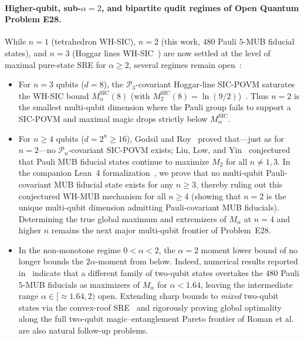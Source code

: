 \documentclass[11pt,a4paper]{article}
\theoremstyle{plain}
\theoremstyle{definition}
\theoremstyle{remark}
\newcommand{\Pauli}{\mathcal{P}}
\begin{document}
\paragraph{Higher-qubit, sub-$\alpha=2$, and bipartite qudit regimes of Open Quantum Problem E28.}
While $n = 1$ (tetrahedron WH-SIC), $n = 2$ (this work, $480$ Pauli $5$-MUB fiducial states), and $n = 3$ (Hoggar lines WH-SIC~\cite{Hoggar1998}) are now settled at the level of maximal pure-state SRE for $\alpha \ge 2$, several regimes remain open~\cite{LiuLowYin2026,OpenQuantumE28}:
\begin{itemize}[leftmargin=1.8em, itemsep=2pt]
  \item For $n = 3$ qubits ($d = 8$), the $\Pauli_3$-covariant Hoggar-line SIC-POVM saturates the WH-SIC bound $M_\alpha^{\mathrm{SIC}}(8)$ (with $M_2^{\mathrm{SIC}}(8) = \ln(9/2)$)~\cite{CuffaroFuchs2024}. Thus $n = 2$ is the smallest multi-qubit dimension where the Pauli group fails to support a SIC-POVM and maximal magic drops strictly below $M_\alpha^{\mathrm{SIC}}$.
  \item For $n \ge 4$ qubits ($d = 2^n \ge 16$), Godsil and Roy~\cite{GodsilRoy2009} proved that---just as for $n = 2$---no $\Pauli_n$-covariant SIC-POVM exists; Liu, Low, and Yin~\cite{LiuLowYin2026} conjectured that Pauli MUB fiducial states continue to maximize $M_2$ for all $n \neq 1, 3$. In the companion Lean~4 formalization~\cite{Ye2026MultiQubitMUB}, we prove that no multi-qubit Pauli-covariant MUB fiducial state exists for any $n \ge 3$, thereby ruling out this conjectured WH-MUB mechanism for all $n \ge 4$ (showing that $n = 2$ is the unique multi-qubit dimension admitting Pauli-covariant MUB fiducials). Determining the true global maximum and extremizers of $M_\alpha$ at $n = 4$ and higher $n$ remains the next major multi-qubit frontier of Problem~E28.
  \item In the non-monotone regime $0 < \alpha < 2$, the $\alpha = 2$ moment lower bound of  no longer bounds the $2\alpha$-moment from below. Indeed, numerical results reported in~\cite{LiuLowYin2026,OpenQuantumE28} indicate that a different family of two-qubit states overtakes the $480$ Pauli $5$-MUB fiducials as maximizers of $M_\alpha$ for $\alpha < 1.64$, leaving the intermediate range $\alpha \in [\approx 1.64, 2)$ open. Extending sharp bounds to \emph{mixed} two-qubit states via the convex-roof SRE~\cite{LeoneBittel2024} and rigorously proving global optimality along the full two-qubit magic--entanglement Pareto frontier of Roman et al.~\cite{Roman2026} are also natural follow-up problems.

\end{itemize}
\end{document}
